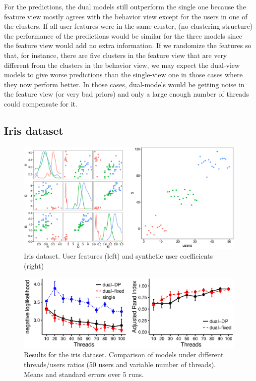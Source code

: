 \documentclass[smallextended]{svjour3}          %
\begin{document}
 
For the predictions, the dual models still outperform the single one because the feature view mostly agrees with the behavior view except for the users in one of the clusters. If all user features were in the same cluster, (no clustering structure) the performance of the predictions would be similar for the three models since the feature view would add no extra information. If we randomize the features so that, for instance, there are five clusters in the feature view that are very different from the clusters in the behavior view, we may expect the dual-view  models to give worse predictions than the single-view one in those cases where they now perform better. In those cases, dual-models would be getting noise in the feature view (or very bad priors) and only a large enough number of threads could compensate for it.

\subsection{Iris dataset}
\begin{figure}
	\centering
	\includegraphics[width=1\textwidth]{Fig7_data_iris}
	\caption{Iris dataset. User features (left) and synthetic user coefficients (right)}
	\label{fig:iris_data}
\end{figure}
\begin{figure}
	\centering
	\includegraphics[width=1\textwidth]{Fig8_results_iris_bw}
	\caption{Results for the iris dataset. Comparison of models under different threads/users ratios (50 users and variable number of threads). Means and standard errors over 5 runs.}
	\label{fig:iris_results}
\end{figure}
\end{document}
